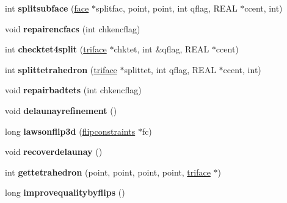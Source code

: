 \begin{DoxyCompactItemize}
\item 
\mbox{\label{classtetgenmesh_a3a8404870ab3c2e8ce4312d48c2b29f4}} 
int {\bfseries splitsubface} (\hyperlink{classtetgenmesh_1_1face}{face} $\ast$splitfac, point, point, int qflag, R\+E\+AL $\ast$ccent, int)
\item 
\mbox{\label{classtetgenmesh_a701d4f317ed66df6a2e2b7b237e2386a}} 
void {\bfseries repairencfacs} (int chkencflag)
\item 
\mbox{\label{classtetgenmesh_ad4bfeb6c3c912f5d59f3e7784df98517}} 
int {\bfseries checktet4split} (\hyperlink{classtetgenmesh_1_1triface}{triface} $\ast$chktet, int \&qflag, R\+E\+AL $\ast$ccent)
\item 
\mbox{\label{classtetgenmesh_aa752155eb1d18550a212dd40297f122e}} 
int {\bfseries splittetrahedron} (\hyperlink{classtetgenmesh_1_1triface}{triface} $\ast$splittet, int qflag, R\+E\+AL $\ast$ccent, int)
\item 
\mbox{\label{classtetgenmesh_a7c46c82d83099214115fa9719aefbd78}} 
void {\bfseries repairbadtets} (int chkencflag)
\item 
\mbox{\label{classtetgenmesh_a477bbfde72103de66546d4ea3343b4a1}} 
void {\bfseries delaunayrefinement} ()
\item 
\mbox{\label{classtetgenmesh_a6755cfa20d8ea6ce62d059750657a292}} 
long {\bfseries lawsonflip3d} (\hyperlink{classtetgenmesh_1_1flipconstraints}{flipconstraints} $\ast$fc)
\item 
\mbox{\label{classtetgenmesh_a4f6f365744005e9d9da43a7d8a1fbba8}} 
void {\bfseries recoverdelaunay} ()
\item 
\mbox{\label{classtetgenmesh_aeaa9ecb1ea77f736117b9dd6ee5855fc}} 
int {\bfseries gettetrahedron} (point, point, point, point, \hyperlink{classtetgenmesh_1_1triface}{triface} $\ast$)
\item 
\mbox{\label{classtetgenmesh_a3d724f195ed9c3f5e1378d1f4f0c5282}} 
long {\bfseries improvequalitybyflips} ()
\item 

\end{DoxyCompactItemize}
